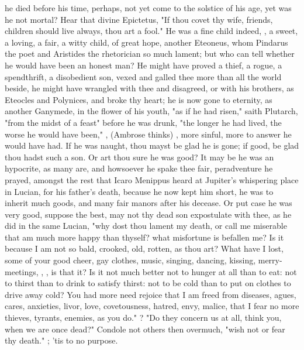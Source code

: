 {he died before his time, perhaps, not yet come to the solstice of his age, yet was he not mortal? Hear that divine Epictetus, "If thou covet thy wife, friends, children should live always, thou art a fool." He was a fine child indeed, , a sweet, a loving, a fair, a witty child, of great hope, another Eteoneus, whom Pindarus the poet and Aristides the rhetorician so much lament; but who can tell whether he would have been an honest man? He might have proved a thief, a rogue, a spendthrift, a disobedient son, vexed and galled thee more than all the world beside, he might have wrangled with thee and disagreed, or with his brothers, as Eteocles and Polynices, and broke thy heart; he is now gone to eternity, as another Ganymede, in the flower of his youth, "as if he had risen," saith Plutarch, "from the midst of a feast" before he was drunk, "the longer he had lived, the worse he would have been," , (Ambrose thinks) , more sinful, more to answer he would have had. If he was naught, thou mayst be glad he is gone; if good, be glad thou hadst such a son. Or art thou sure he was good? It may be he was an hypocrite, as many are, and howsoever he spake thee fair, peradventure he prayed, amongst the rest that Icaro Menippus heard at Jupiter's whispering place in Lucian, for his father's death, because he now kept him short, he was to inherit much goods, and many fair manors after his decease. Or put case he was very good, suppose the best, may not thy dead son expostulate with thee, as he did in the same Lucian, "why dost thou lament my death, or call me miserable that am much more happy than thyself? what misfortune is befallen me? Is it because I am not so bald, crooked, old, rotten, as thou art? What have I lost, some of your good cheer, gay clothes, music, singing, dancing, kissing, merry-meetings, , \etc{}, is that it? Is it not much better not to hunger at all than to eat: not to thirst than to drink to satisfy thirst: not to be cold than to put on clothes to drive away cold? You had more need rejoice that I am freed from diseases, agues, cares, anxieties, livor, love, covetousness, hatred, envy, malice, that I fear no more thieves, tyrants, enemies, as you do." ? "Do they concern us at all, think you, when we are once dead?" Condole not others then overmuch, "wish not or fear thy death." ; 'tis to no purpose.

}

